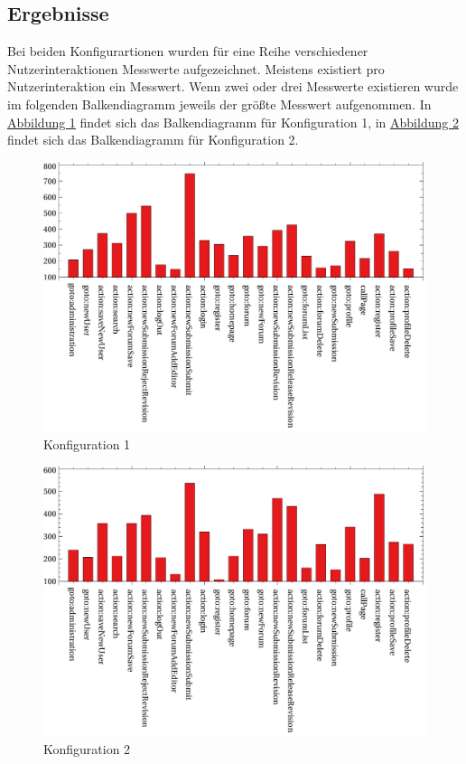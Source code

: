 \subsection{Ergebnisse}

Bei beiden Konfigurartionen wurden für eine Reihe verschiedener Nutzerinteraktionen Messwerte aufgezeichnet. Meistens existiert pro Nutzerinteraktion ein Messwert. Wenn zwei oder drei Messwerte existieren wurde im folgenden Balkendiagramm jeweils der größte Messwert aufgenommen. In \hyperref[fig:worst30]{Abbildung 1} findet sich das Balkendiagramm für Konfiguration 1, in \hyperref[fig:worst50]{Abbildung 2} findet sich das Balkendiagramm für Konfiguration 2.

\begin{figure}[H]
	\includegraphics[width=\linewidth]{graphics/30worstcase.pdf}
	\caption{Konfiguration 1}
	\label{fig:worst30}	
\end{figure}
\begin{figure}[H]
	\includegraphics[width=\linewidth]{graphics/50worstcase.pdf}
	\caption{Konfiguration 2}
	\label{fig:worst50}	
\end{figure}

